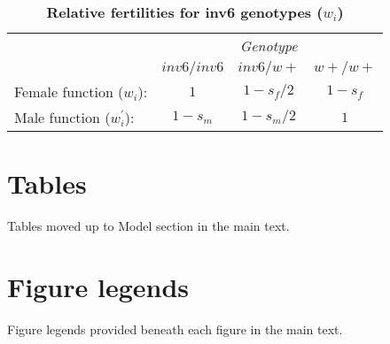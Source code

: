\documentclass[11pt]{article}
\begin{document}
\begin{table}[htbp]
 \centering
 \caption{\bf Relative fertilities for inv6 genotypes ($w_{i}$)}
\label{tab:inv6Fitness}
\begin{tabular}{lccc}
 \toprule
					&  \multicolumn{3}{c}{{\textit{Genotype}}} \\ 
\cline{2-4}
									& $inv6/inv6$	& $inv6/w+$		& $w+/w+$ 	\\ \hline
Female function ($w_{i}$):			& $1$			& $1 - s_f/2$	& $1 - s_f$ \\	
Male function ($w^{\prime}_{i}$):	& $1 - s_m$		& $1 - s_m/2$	& $1$ 		\\	
\hline
\end{tabular}
\end{table}




%
%
\newpage{}





\section{Tables}
\renewcommand{\thetable}{\arabic{table}}
\setcounter{table}{0}

Tables moved up to Model section in the main text.

\section{Figure legends}

Figure legends provided beneath each figure in the main text.

\end{document}
